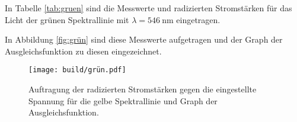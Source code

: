In Tabelle \ref{tab:gruen} sind die Messwerte und radizierten Stromstärken
für das Licht der grünen Spektrallinie mit $\lambda = \SI{546}{\nano\meter}$
eingetragen.

In Abbildung \ref{fig:grün} sind diese Messwerte aufgetragen und der Graph der Ausgleichsfunktion zu
diesen eingezeichnet.

\begin{figure}
  \centering
  \texttt{[image: build/grün.pdf]}
  \caption{Auftragung der radizierten Stromstärken gegen die eingestellte Spannung für die gelbe Spektrallinie und Graph der Ausgleichsfunktion.}
  \label{fig:gelb}
\end{figure}
